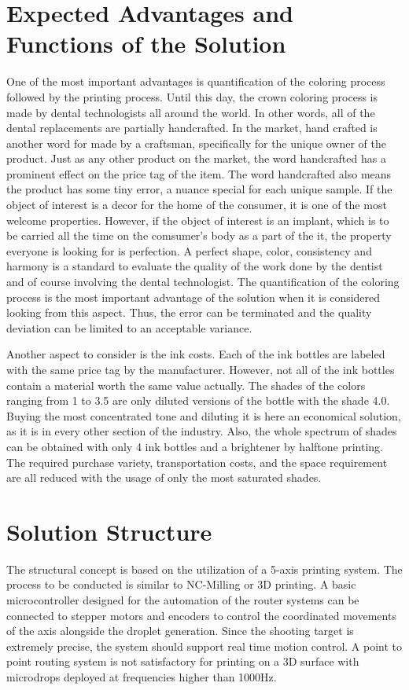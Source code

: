  

\chapter{Expected Advantages and Functions of the Solution}
One of the most important advantages is quantification of the coloring process followed by the printing process. Until this day, the crown coloring process is made by dental technologists all around the world. In other words, all of the dental replacements are partially handcrafted. In the market, hand crafted is another word for made by a craftsman, specifically for the unique owner of the product. Just as any other product on the market, the word handcrafted has a prominent effect on the price tag of the item. The word handcrafted also means the product has some tiny error, a nuance special for each unique sample. If the object of interest is a decor for the home of the consumer, it is one of the most welcome properties. However, if the object of interest is an implant, which is to be carried all the time on the comsumer's body as a part of the it, the property everyone is looking for is perfection. A perfect shape, color, consistency and harmony is a standard to evaluate the quality of the work done by the dentist and of course involving the dental technologist. The quantification of the coloring process is the most important advantage of the solution when it is considered looking from this aspect. Thus, the error can be terminated and the quality deviation can be limited to an acceptable variance. 

Another aspect to consider is the ink costs. Each of the ink bottles are labeled with the same price tag by the manufacturer. However, not all of the ink bottles contain a material worth the same value actually. The shades of the colors ranging from 1 to 3.5 are only diluted versions of the bottle with the shade 4.0. Buying the most concentrated tone and diluting it is here an economical solution, as it is in every other section of the industry. Also, the whole spectrum of shades can be obtained with only 4 ink bottles and a brightener by halftone printing. The required purchase variety, transportation costs, and the space requirement are all reduced with the usage of only the most saturated shades.

\chapter{Solution Structure}
The structural concept is based on the utilization of a 5-axis printing system. The process to be conducted is similar to NC-Milling or 3D printing. A basic microcontroller designed for the automation of the router systems can be connected to stepper motors and encoders to control the coordinated movements of the axis alongside the droplet generation. Since the shooting target is extremely precise, the system should support real time motion control. A point to point routing system is not satisfactory for printing on a 3D surface with microdrops deployed at frequencies higher than 1000Hz.

